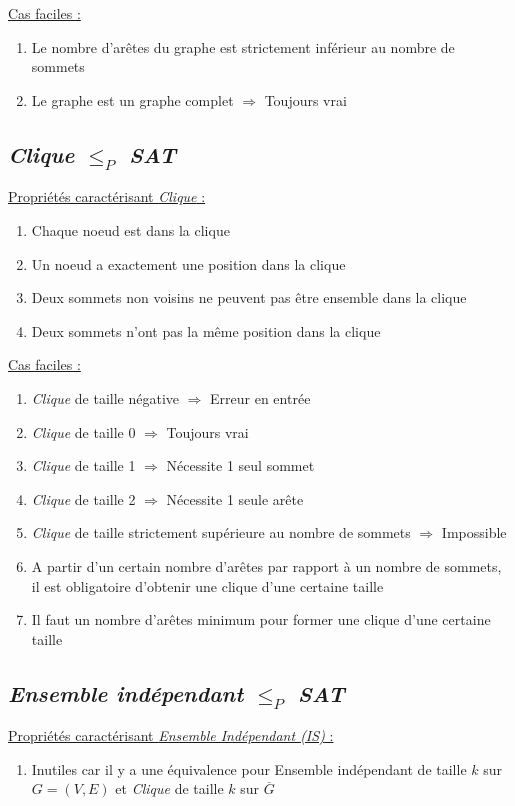   \underline{Cas faciles :}
  \begin{enumerate}
   \item Le nombre d'arêtes du graphe est strictement inférieur au
	 nombre de sommets
   \item Le graphe est un graphe complet $\Rightarrow$ Toujours vrai
  \end{enumerate}

  \subsection{\emph{Clique} $\leq_P$ \emph{SAT}}
  \underline{Propriétés caractérisant \emph{Clique} :}
  \begin{enumerate}
   \item Chaque noeud est dans la clique
   \item Un noeud a exactement une position dans la clique
   \item Deux sommets non voisins ne peuvent pas être ensemble dans la
	 clique
   \item Deux sommets n'ont pas la même position dans la clique
  \end{enumerate}

  \underline{Cas faciles :}
  \begin{enumerate}
   \item \emph{Clique} de taille négative $\Rightarrow$ Erreur en entrée
   \item \emph{Clique} de taille 0 $\Rightarrow$ Toujours vrai
   \item \emph{Clique} de taille 1 $\Rightarrow$ Nécessite 1 seul sommet
   \item \emph{Clique} de taille 2 $\Rightarrow$ Nécessite 1 seule arête
   \item \emph{Clique} de taille strictement supérieure au nombre de
	 sommets $\Rightarrow$ Impossible
   \item A partir d'un certain nombre d'arêtes par rapport à un nombre
	 de sommets, il est obligatoire d'obtenir une clique d'une
	 certaine taille
   \item Il faut un nombre d'arêtes minimum pour former une clique d'une
	 certaine taille
  \end{enumerate}

  \subsection{\emph{Ensemble indépendant} $\leq_P$ \emph{SAT}}
  \underline{Propriétés caractérisant \emph{Ensemble Indépendant (IS)} :}
  \begin{enumerate}
   \item Inutiles car il y a une équivalence pour Ensemble indépendant
	 de taille $k$ sur $G = (V,E)$ et \emph{Clique} de taille $k$
	 sur $\overline{G}$
  \end{enumerate}

